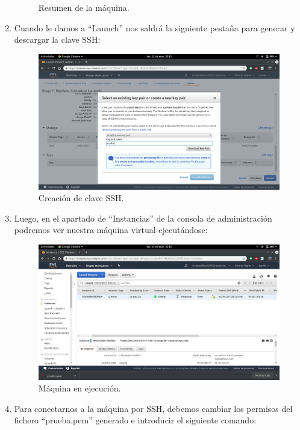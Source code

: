 \begin{enumerate}
\begin{figure}[h]
		\caption{Resumen de la máquina.}
		\label{Resumen de la máquina}
	\end{figure}
	\item Cuando le damos a ``Launch'' nos saldrá la siguiente pestaña para generar y descargar la clave SSH:
	\begin{figure}[h]
		\centering
		\includegraphics[scale=0.28]{ImagenesAWS/MV/13.png}
		\caption{Creación de clave SSH.}
		\label{Creación de clave SSH}
	\end{figure}
\newpage
	\item Luego, en el apartado de ``Instancias'' de la consola de administración podremos ver nuestra máquina virtual ejecutándose:
	\begin{figure}[h]
		\centering
		\includegraphics[scale=0.28]{ImagenesAWS/MV/15.png}
		\caption{Máquina en ejecución.}
		\label{Máquina en ejecución}
	\end{figure}
	\item Para conectarnos a la máquina por SSH, debemos cambiar los permisos del fichero ``prueba.pem'' generado e introducir el siguiente comando:
	\begin{center}

\end{center}
\end{enumerate}
